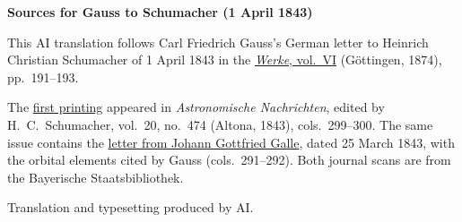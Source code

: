 \clearpage\thispagestyle{empty}
\begin{center}\textbf{Sources for Gauss to Schumacher (1 April 1843)}\end{center}
\noindent This AI translation follows Carl Friedrich Gauss’s German letter to Heinrich Christian Schumacher of 1 April 1843 in the \href{https://gdz.sub.uni-goettingen.de/id/PPN236007467}{\textit{Werke}, vol.~VI} (Göttingen, 1874), pp.~191--193.
\par\smallskip\noindent The \href{https://api.digitale-sammlungen.de/iiif/image/v2/bsb10049445_00162/full/1600,/0/default.jpg}{first printing} appeared in \textit{Astronomische Nachrichten}, edited by H.~C.~Schumacher, vol.~20, no.~474 (Altona, 1843), cols.~299--300. The same issue contains the \href{https://api.digitale-sammlungen.de/iiif/image/v2/bsb10049445_00158/full/1450,/0/default.jpg}{letter from Johann Gottfried Galle}, dated 25 March 1843, with the orbital elements cited by Gauss (cols.~291--292). Both journal scans are from the Bayerische Staatsbibliothek.
\par\smallskip\noindent Translation and typesetting produced by AI.
\clearpage
